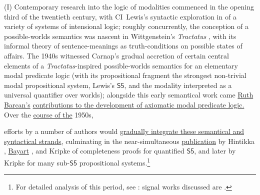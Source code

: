 \documentclass[12pt]{article}
\begin{document}
(I) Contemporary research into the logic of modalities commenced in the
opening third of the twentieth century, with CI~Lewis's syntactic exploration
in \citep{lewislangford32} of a variety of systems of intensional logic;
roughly concurrently, the conception of a possible-worlds semantics was
nascent in Wittgenstein's \emph{Tractatus} \citep{witttlp}, with its informal
theory of sentence-meanings as truth-conditions on possible states of affairs.
The 1940s witnessed Carnap's gradual accretion
\citep{carnapis,carnap46,carnapmn} of certain central elements of a
\emph{Tractatus}-inspired possible-worlds semantics for an elementary modal
predicate logic (with its propositional fragment the strongest non-trivial
modal propositional system, Lewis's $\mathsf{S5}$, and the modality
interpreted as a universal quantifier over worlds); alongside this early
semantical work came \ul{Ruth Barcan's} \citep{barcan46b,barcan46a,barcan47}
\ul{contributions to the development of axiomatic modal predicate logic.} %
Over the \ul{course of the} 1950s, 
\begin{comment} 
around a dozen authors separately
(varying in format, center of emphasis, level of sophistication, scope of
coverage, and degree of explicitness) proposed the device of the
`accessibility relation' over possible worlds, to serve the semantical
analysis of propositional systems weaker than $\mathsf{S5}$, while a smaller
group attempted strategies for integrating Tarski-style domain semantics for
first-order quantifiers; these 
\end{comment} 
efforts by a number of
authors would \ul{gradually integrate these semantical and syntactical
strands},
culminating in the near-simultaneous \ul{publication} by 
Hintikka \citep{hintikka}, \ul{Bayart} \citep{Bayart1959-BAYQDL}, and Kripke
\citep{kripke59} of completeness proofs for quantified $\mathsf{S5}$, and
later by Kripke \citep{Kripke1963-KRISAO} for many sub-$\mathsf{S5}$
propositional systems.\footnote{For detailed analysis of this period, see
\citep{copeland02}: signal works discussed are
\citep{McKinsey1948-MCKSTA,jonsson-tarski,jonsson-tarski-2,vonwright53,meredithprior56,montague60,kripke59,kripke63,Hintikka1961-HINMAQ,Lemmon1966-LEMASF-3}.}
\end{document}
